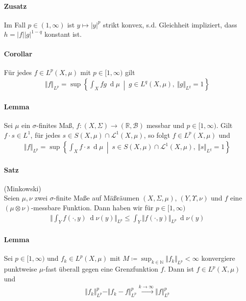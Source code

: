 \documentclass[12pt,a4paper,fleqn]{article}
\def\set#1{{\left\{ #1 \right\}}}
\def\Mid{\ \middle|\ }
\def\d{{\operatorname{d}}}
\begin{document}
\paragraph{Zusatz} Im Fall $p \in (1, \infty)$ ist $y \mapsto \vert y \vert^p$ strikt konvex, s.d. Gleichheit impliziert, dass $h = \vert f \vert \vert g \vert^{1 - q}$ konstant ist.

\paragraph{Corollar} Für jedes $f \in {L}^p(X, \mu)$ mit $p \in [1, \infty)$ gilt
\begin{align*}
\Vert f \Vert_{L^p} = \sup \set{ \int_X fg\ \d\mu \Mid g \in L^{q}(X, \mu),\ \Vert g \Vert_{L^{q}} = 1 }
\end{align*}

\paragraph{Lemma} Sei $\mu$ ein $\sigma$-finites Maß, $f\colon (X, \Sigma) \rightarrow (\mathbb{R}, \mathcal{B})$ messbar und $p \in [1, \infty)$. Gilt $f \cdot s \in {L}^1$, für jedes $s \in S(X, \mu) \cap \mathscr{L}^1(X, \mu)$, so folgt $f \in {L}^p(X, \mu)$ und 
\begin{align*}
\Vert f \Vert_{L^p} = \sup \set{ \int_X f \cdot s\ \d\mu \Mid s \in S(X, \mu) \cap \mathscr{L}^1(X, \mu),\ \Vert s \Vert_{L^{q}} = 1 }
\end{align*}

\paragraph{Satz} (Minkowski)\\
Seien $\mu, \nu$ zwei $\sigma$-finite Maße auf Mäßräumen $(X, \Sigma, \mu)$, $(Y, \Upsilon, \nu)$ und $f$ eine\linebreak \mbox{$(\mu \otimes \nu)$-messbare} Funktion. Dann haben wir für $p \in [1, \infty)$
\begin{align*}
\bigg \Vert \int_Y f(\cdot, y)\ \d\nu(y)\bigg\Vert_{L^p} \leq \int_Y \Vert f(\cdot, y) \Vert_{L^p} \ \d\nu(y)
\end{align*}

\paragraph{Lemma} Sei $p \in [1, \infty)$ und $f_k \in {L}^p(X, \mu)$ mit $M \coloneqq \sup_{k \in \mathbb{N}} \Vert f_k \Vert_{L^p} < \infty$ konvergiere punktweise $\mu$-fast überall gegen eine Grenzfunktion $f$. Dann ist $f \in {L}^p(X, \mu)$ und 
\begin{align*}
\Vert f_k \Vert^p_{L^p} - \Vert f_k - f \Vert^p_{L^p} \xrightarrow{k \rightarrow \infty} \Vert f \Vert^p_{L^p}
\end{align*}
\end{document}
